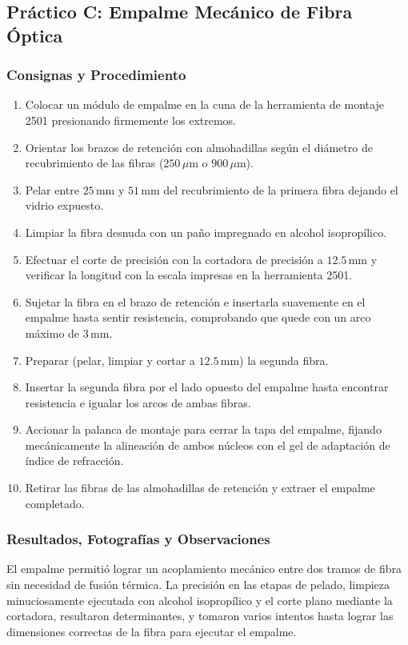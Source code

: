 \subsection{Práctico C: Empalme Mecánico de Fibra Óptica}

\subsubsection*{Consignas y Procedimiento}
\begin{enumerate}
    \item Colocar un módulo de empalme en la cuna de la herramienta de montaje 2501 presionando firmemente los extremos.
    \item Orientar los brazos de retención con almohadillas según el diámetro de recubrimiento de las fibras ($250\,\mu\text{m}$ o $900\,\mu\text{m}$).
    \item Pelar entre $25\,\text{mm}$ y $51\,\text{mm}$ del recubrimiento de la primera fibra dejando el vidrio expuesto.
    \item Limpiar la fibra desnuda con un paño impregnado en alcohol isopropílico.
    \item Efectuar el corte de precisión con la cortadora de precisión a $12.5\,\text{mm}$ y verificar la longitud con la escala impresas en la herramienta 2501.
    \item Sujetar la fibra en el brazo de retención e insertarla suavemente en el empalme hasta sentir resistencia, comprobando que quede con un arco máximo de $3\,\text{mm}$.
    \item Preparar (pelar, limpiar y cortar a $12.5\,\text{mm}$) la segunda fibra.
    \item Insertar la segunda fibra por el lado opuesto del empalme hasta encontrar resistencia e igualar los arcos de ambas fibras.
    \item Accionar la palanca de montaje para cerrar la tapa del empalme, fijando mecánicamente la alineación de ambos núcleos con el gel de adaptación de índice de refracción.
    \item Retirar las fibras de las almohadillas de retención y extraer el empalme completado.
\end{enumerate}

\subsubsection*{Resultados, Fotografías y Observaciones}

El empalme permitió lograr un acoplamiento mecánico entre dos tramos de fibra sin necesidad de fusión térmica. La precisión en las etapas de pelado, limpieza minuciosamente ejecutada con alcohol isopropílico y el corte plano mediante la cortadora, resultaron determinantes, y tomaron varios intentos hasta lograr las dimensiones correctas de la fibra para ejecutar el empalme.

